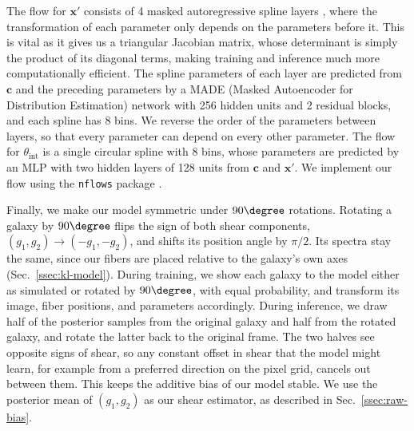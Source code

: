 The flow for $\mathbf{x}'$ consists of 4 masked autoregressive spline layers \citep{MAF, NeuralSplineFlows}, where the transformation of each parameter only depends on the parameters before it. This is vital as it gives us a triangular Jacobian matrix, whose determinant is simply the product of its diagonal terms, making training and inference much more computationally efficient. The spline parameters of each layer are predicted from $\mathbf{c}$ and the preceding parameters by a MADE (Masked Autoencoder for Distribution Estimation) network \citep{MADE} with 256 hidden units and 2 residual blocks, and each spline has 8 bins. We reverse the order of the parameters between layers, so that every parameter can depend on every other parameter. The flow for $\theta_\mathrm{int}$ is a single circular spline with 8 bins, whose parameters are predicted by an MLP with two hidden layers of 128 units from $\mathbf{c}$ and $\mathbf{x}'$. We implement our flow using the \texttt{nflows} package \citep{nflows}.

Finally, we make our model symmetric under $90\degree$ rotations. Rotating a galaxy by $90\degree$ flips the sign of both shear components, $(g_1, g_2) \rightarrow (-g_1, -g_2)$, and shifts its position angle by $\pi/2$. Its spectra stay the same, since our fibers are placed relative to the galaxy's own axes (Sec.~\ref{ssec:kl-model}). During training, we show each galaxy to the model either as simulated or rotated by $90\degree$, with equal probability, and transform its image, fiber positions, and parameters accordingly. During inference, we draw half of the posterior samples from the original galaxy and half from the rotated galaxy, and rotate the latter back to the original frame. The two halves see opposite signs of shear, so any constant offset in shear that the model might learn, for example from a preferred direction on the pixel grid, cancels out between them. This keeps the additive bias of our model stable. We use the posterior mean of $(g_1, g_2)$ as our shear estimator, as described in Sec.~\ref{ssec:raw-bias}.

